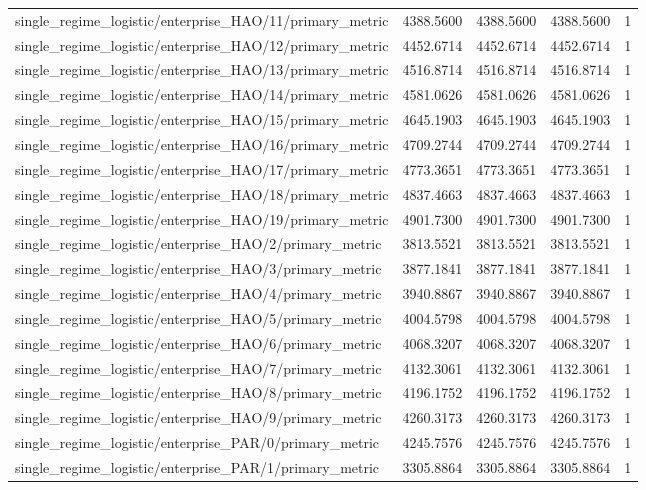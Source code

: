 \begin{table}[h]
\begin{tabular}{lrrrr}
single_regime_logistic/enterprise_HAO/11/primary_metric & 4388.5600 & 4388.5600 & 4388.5600 & 1 \\
single_regime_logistic/enterprise_HAO/12/primary_metric & 4452.6714 & 4452.6714 & 4452.6714 & 1 \\
single_regime_logistic/enterprise_HAO/13/primary_metric & 4516.8714 & 4516.8714 & 4516.8714 & 1 \\
single_regime_logistic/enterprise_HAO/14/primary_metric & 4581.0626 & 4581.0626 & 4581.0626 & 1 \\
single_regime_logistic/enterprise_HAO/15/primary_metric & 4645.1903 & 4645.1903 & 4645.1903 & 1 \\
single_regime_logistic/enterprise_HAO/16/primary_metric & 4709.2744 & 4709.2744 & 4709.2744 & 1 \\
single_regime_logistic/enterprise_HAO/17/primary_metric & 4773.3651 & 4773.3651 & 4773.3651 & 1 \\
single_regime_logistic/enterprise_HAO/18/primary_metric & 4837.4663 & 4837.4663 & 4837.4663 & 1 \\
single_regime_logistic/enterprise_HAO/19/primary_metric & 4901.7300 & 4901.7300 & 4901.7300 & 1 \\
single_regime_logistic/enterprise_HAO/2/primary_metric & 3813.5521 & 3813.5521 & 3813.5521 & 1 \\
single_regime_logistic/enterprise_HAO/3/primary_metric & 3877.1841 & 3877.1841 & 3877.1841 & 1 \\
single_regime_logistic/enterprise_HAO/4/primary_metric & 3940.8867 & 3940.8867 & 3940.8867 & 1 \\
single_regime_logistic/enterprise_HAO/5/primary_metric & 4004.5798 & 4004.5798 & 4004.5798 & 1 \\
single_regime_logistic/enterprise_HAO/6/primary_metric & 4068.3207 & 4068.3207 & 4068.3207 & 1 \\
single_regime_logistic/enterprise_HAO/7/primary_metric & 4132.3061 & 4132.3061 & 4132.3061 & 1 \\
single_regime_logistic/enterprise_HAO/8/primary_metric & 4196.1752 & 4196.1752 & 4196.1752 & 1 \\
single_regime_logistic/enterprise_HAO/9/primary_metric & 4260.3173 & 4260.3173 & 4260.3173 & 1 \\
single_regime_logistic/enterprise_PAR/0/primary_metric & 4245.7576 & 4245.7576 & 4245.7576 & 1 \\
single_regime_logistic/enterprise_PAR/1/primary_metric & 3305.8864 & 3305.8864 & 3305.8864 & 1 \\

\end{tabular}
\end{table}
